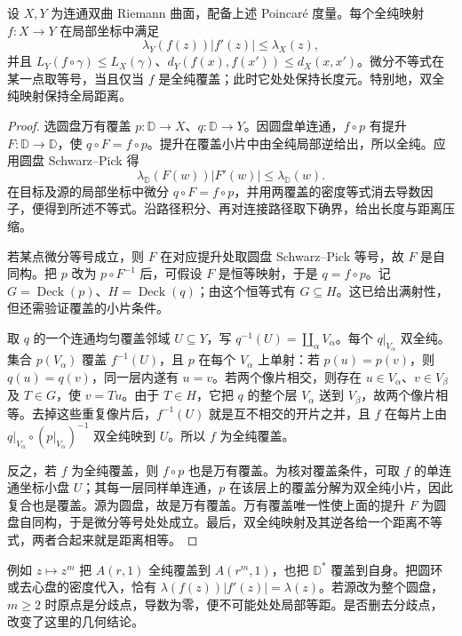 \begin{theorem}\label{b3:thm:13-hyperbolic-schwarz-pick}
设 \(X,Y\) 为连通双曲 Riemann 曲面，配备上述 Poincaré 度量。每个全纯映射 \(f:X\to Y\) 在局部坐标中满足
\[
 \lambda_Y(f(z))|f'(z)|\le\lambda_X(z),
\]
并且 \(L_Y(f\circ\gamma)\le L_X(\gamma)\)、\(d_Y(f(x),f(x'))\le d_X(x,x')\)。微分不等式在某一点取等号，当且仅当 \(f\) 是全纯覆盖；此时它处处保持长度元。特别地，双全纯映射保持全局距离。
\end{theorem}
\begin{proof}
选圆盘万有覆盖 \(p:\mathbb D\to X\)、\(q:\mathbb D\to Y\)。因圆盘单连通，\(f\circ p\) 有提升 \(F:\mathbb D\to\mathbb D\)，使 \(q\circ F=f\circ p\)。提升在覆盖小片中由全纯局部逆给出，所以全纯。应用圆盘 Schwarz--Pick 得
\[
 \lambda_{\mathbb D}(F(w))|F'(w)|\le\lambda_{\mathbb D}(w).
\]
在目标及源的局部坐标中微分 \(q\circ F=f\circ p\)，并用两覆盖的密度等式消去导数因子，便得到所述不等式。沿路径积分、再对连接路径取下确界，给出长度与距离压缩。

若某点微分等号成立，则 \(F\) 在对应提升处取圆盘 Schwarz--Pick 等号，故 \(F\) 是自同构。把 \(p\) 改为 \(p\circ F^{-1}\) 后，可假设 \(F\) 是恒等映射，于是 \(q=f\circ p\)。记 \(G=\operatorname{Deck}(p)\)、\(H=\operatorname{Deck}(q)\)；由这个恒等式有 \(G\subseteq H\)。这已给出满射性，但还需验证覆盖的小片条件。

取 \(q\) 的一个连通均匀覆盖邻域 \(U\subseteq Y\)，写 \(q^{-1}(U)=\coprod_\alpha V_\alpha\)。每个 \(q|_{V_\alpha}\) 双全纯。集合 \(p(V_\alpha)\) 覆盖 \(f^{-1}(U)\)，且 \(p\) 在每个 \(V_\alpha\) 上单射：若 \(p(u)=p(v)\)，则 \(q(u)=q(v)\)，同一层内遂有 \(u=v\)。若两个像片相交，则存在 \(u\in V_\alpha\)、\(v\in V_\beta\) 及 \(T\in G\)，使 \(v=Tu\)。由于 \(T\in H\)，它把 \(q\) 的整个层 \(V_\alpha\) 送到 \(V_\beta\)，故两个像片相等。去掉这些重复像片后，\(f^{-1}(U)\) 就是互不相交的开片之并，且 \(f\) 在每片上由 \(q|_{V_\alpha}\circ(p|_{V_\alpha})^{-1}\) 双全纯映到 \(U\)。所以 \(f\) 为全纯覆盖。

反之，若 \(f\) 为全纯覆盖，则 \(f\circ p\) 也是万有覆盖。为核对覆盖条件，可取 \(f\) 的单连通坐标小盘 \(U\)；其每一层同样单连通，\(p\) 在该层上的覆盖分解为双全纯小片，因此复合也是覆盖。源为圆盘，故是万有覆盖。万有覆盖唯一性使上面的提升 \(F\) 为圆盘自同构，于是微分等号处处成立。最后，双全纯映射及其逆各给一个距离不等式，两者合起来就是距离相等。
\end{proof}
例如 \(z\mapsto z^m\) 把 \(A(r,1)\) 全纯覆盖到 \(A(r^m,1)\)，也把 \(\mathbb D^*\) 覆盖到自身。把圆环或去心盘的密度代入，恰有 \(\lambda(f(z))|f'(z)|=\lambda(z)\)。若源改为整个圆盘，\(m\ge2\) 时原点是分歧点，导数为零，便不可能处处局部等距。是否删去分歧点，改变了这里的几何结论。

